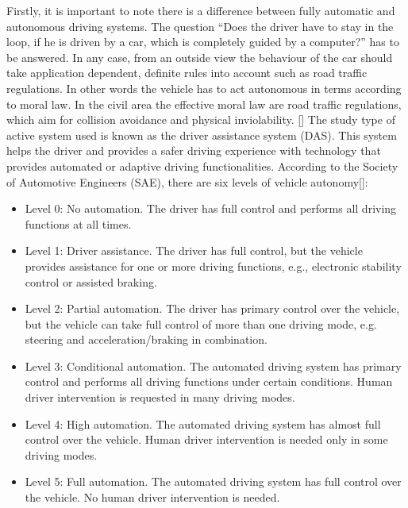 \documentclass{article}
\begin{document}
Firstly, it is important to note there is a difference between fully automatic and autonomous driving systems. The question “Does the driver have to stay in the loop, if he is driven by a car, which is completely guided by a computer?” has to be answered. In any case, from an outside view the behaviour of the car should take application dependent, definite rules into account such as road traffic regulations. In other words the vehicle has to act autonomous in terms according to moral law. In the civil area the effective moral law are road traffic regulations, which aim for collision avoidance and physical inviolability. [\textcite{horwick2010strategy}]
\bigbreak
The study type of active system used is known as the driver assistance system (DAS). This system helps the driver and provides a safer driving experience with technology that provides automated or adaptive driving functionalities. According to the Society of Automotive Engineers (SAE), there are six levels of vehicle autonomy[\textcite{curiel2019towards}]:
\bigbreak
\begin{itemize}
\item Level 0: No automation. The driver has full control and performs all driving functions at all times.

\item Level 1: Driver assistance. The driver has full control, but the vehicle provides assistance for one or more driving functions, e.g., electronic stability control or assisted braking.

\item Level 2: Partial automation. The driver has primary control over the vehicle, but the vehicle can take full control of more than one driving mode, e.g. steering and acceleration/braking in combination.

\item Level 3: Conditional automation. The automated driving system has primary control and performs all driving functions under certain conditions. Human driver intervention is requested in many driving modes.

\item Level 4: High automation. The automated driving system has almost full control over the vehicle. Human driver intervention is needed only in some driving modes.

\item Level 5: Full automation. The automated driving system has full control over the vehicle. No human driver intervention is needed.
\end{itemize}
\end{document}
